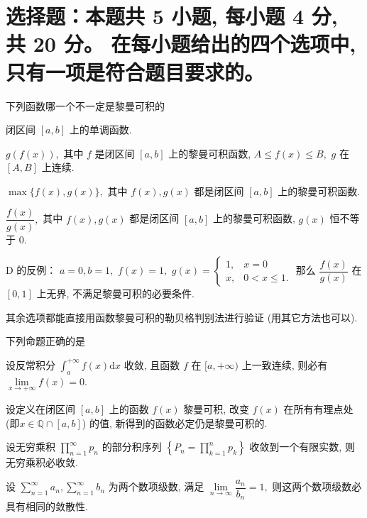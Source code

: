 \fi


\section{%
  选择题：本题共 5 小题, 每小题 4 分, 共 20 分。
  在每小题给出的四个选项中, 只有一项是符合题目要求的。
}


\begin{question}
  下列函数哪一个不一定是黎曼可积的 \paren[D]

  \begin{choices}
    \item 闭区间 $[a, b]$ 上的单调函数.
    \item $g(f(x)),$ 其中 $f$ 是闭区间 $[a, b]$ 上的黎曼可积函数, $A \leqslant f(x) \leqslant B,$ $g$ 在 $[A, B]$ 上连续.
    \item $\max\{f(x), g(x)\},$ 其中 $f(x), g(x)$ 都是闭区间 $[a, b]$ 上的黎曼可积函数.
    \item $\dfrac{f(x)}{g(x)},$ 其中 $f(x), g(x)$ 都是闭区间 $[a, b]$ 上的黎曼可积函数, $g(x)$ 恒不等于 $0.$
  \end{choices}
\end{question}

\begin{solution}
  D 的反例： $a = 0, b = 1,$ $f(x) = 1,$ $g(x) = \begin{cases}
    1, & x = 0 \\ x, & 0 < x \leqslant 1.
  \end{cases}$ 那么 $\dfrac{f(x)}{g(x)}$ 在 $[0, 1]$ 上无界, 不满足黎曼可积的必要条件.

  其余选项都能直接用函数黎曼可积的勒贝格判别法进行验证 (用其它方法也可以).
\end{solution}

\begin{question}
  下列命题正确的是 \paren[A]

  \begin{choices}
    \item 设反常积分 $\int_a^{+\infty} f(x) \mathrm{d} x$ 收敛, 且函数 $f$ 在 $[a, +\infty)$ 上一致连续, 则必有 $\lim\limits_{x \to +\infty} f(x) = 0.$
    \item 设定义在闭区间 $[a, b]$ 上的函数 $f(x)$ 黎曼可积, 改变 $f(x)$ 在所有有理点处 (即$x \in \mathbb{Q} \cap [a, b]$) 的值, 新得到的函数必定仍是黎曼可积的.
    \item 设无穷乘积 $\prod\limits_{n=1}^{\infty} p_n$ 的部分积序列 $\left\{ P_n = \prod\limits_{k=1}^{n} p_k \right\}$ 收敛到一个有限实数, 则无穷乘积必收敛.
    \item 设 $\sum\limits_{n=1}^{\infty} a_n, \sum\limits_{n=1}^{\infty} b_n$ 为两个数项级数, 满足 $\lim\limits_{n\to\infty} \dfrac{a_n}{b_n} = 1,$ 则这两个数项级数必具有相同的敛散性.
  \end{choices}
\end{question}

